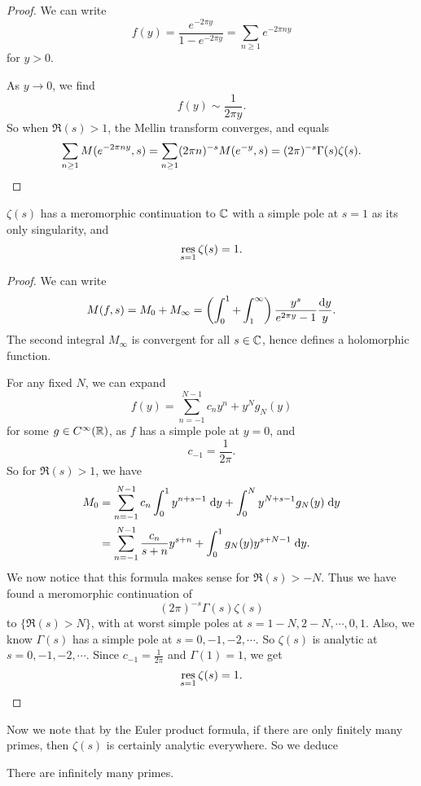 \documentclass[a4paper]{article}
\begin{document}
\begin{proof}
  We can write
  \[
    f(y) = \frac{e^{-2\pi y}}{1 - e^{-2 \pi y}} = \sum_{n \geq 1} e^{-2\pi n y}
  \]
  for $y > 0$.

  As $y \to 0$, we find
  \[
    f(y) \sim \frac{1}{2\pi y}.
  \]
  So when $\Re(s) > 1$, the Mellin transform converges, and equals
  \[
    \sum_{n \geq 1} M(e^{-2\pi n y}, s) = \sum_{n \geq 1} (2\pi n)^{-s} M(e^{-y}, s) = (2\pi)^{-s} \Gamma(s) \zeta(s).\qedhere
  \]
\end{proof}

\begin{cor}
  $\zeta(s)$ has a meromorphic continuation to $\mathbb{C}$ with a simple pole at $s = 1$ as its only singularity, and
  \[
    \operatorname*{res}_{s = 1}\zeta(s) = 1.
  \]
\end{cor}

\begin{proof}
  We can write
  \[
    M(f, s) = M_0 + M_\infty = \left(\int_0^1 + \int_1^\infty\right) \frac{y^s}{e^{2\pi y} - 1} \frac{\mathrm{d} y}{y}.
  \]
  The second integral $M_\infty$ is convergent for all $s \in \mathbb{C}$, hence defines a holomorphic function.

  For any fixed $N$, we can expand
  \[
    f(y) = \sum_{n = -1}^{N - 1} c_n y^n + y^N g_N(y)
  \]
  for some $g \in C^\infty(\mathbb{R})$, as $f$ has a simple pole at $y = 0$, and
  \[
    c_{-1} = \frac{1}{2\pi}.
  \]
  So for $\Re(s) > 1$, we have
  \begin{align*}
    M_0 &= \sum_{n = -1}^{N - 1} c_n \int_0^1 y^{n + s - 1} \;\mathrm{d} y + \int_0^N y^{N + s - 1} g_N(y) \;\mathrm{d} y\\
    &= \sum_{n = -1}^{N - 1} \frac{c_n}{s + n} y^{s + n} + \int_0^1 g_N(y) y^{s + N - 1} \;\mathrm{d} y.
  \end{align*}
  We now notice that this formula makes sense for $\Re(s) > -N$. Thus we have found a meromorphic continuation of
  \[
    (2\pi)^{-s} \Gamma(s) \zeta(s)
  \]
  to $\{\Re(s) > N\}$, with at worst simple poles at $s = 1 - N, 2 - N, \cdots, 0, 1$. Also, we know $\Gamma(s)$ has a simple pole at $s = 0, -1, -2, \cdots$. So $\zeta(s)$ is analytic at $s = 0, -1, -2, \cdots$. Since $c_{-1} = \frac{1}{2\pi}$ and $\Gamma(1) = 1$, we get
  \[
    \operatorname*{res}_{s = 1} \zeta(s) = 1.\qedhere
  \]
\end{proof}

Now we note that by the Euler product formula, if there are only finitely many primes, then $\zeta(s)$ is certainly analytic everywhere. So we deduce
\begin{cor}
  There are infinitely many primes.
\end{cor}
\end{document}
